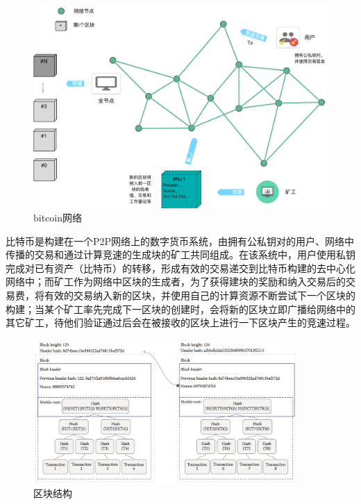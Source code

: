 \begin{figure}[htbp]
 	\centering
 	\includegraphics[width = 1\textwidth]{img/bitcoin_network}
 	\caption{bitcoin网络}\label{fig:bitcoin_network}
\end{figure}

比特币是构建在一个P2P网络上的数字货币系统，由拥有公私钥对的用户、网络中传播的交易和通过计算竞速的生成块的矿工共同组成。在该系统中，用户使用私钥完成对已有资产（比特币）的转移，形成有效的交易递交到比特币构建的去中心化网络中；而矿工作为网络中区块的生成者，为了获得建块的奖励和纳入交易后的交易费，将有效的交易纳入新的区块，并使用自己的计算资源不断尝试下一个区块的构建；当某个矿工率先完成下一区块的创建时，会将新的区块立即广播给网络中的其它矿工，待他们验证通过后会在被接收的区块上进行一下区块产生的竞速过程。




\begin{figure}[!htbp]
 	\centering
 	\includegraphics[width = 0.9\textwidth]{img/block_structure}
 	\caption{区块结构}\label{fig:block_structure}
\end{figure}

